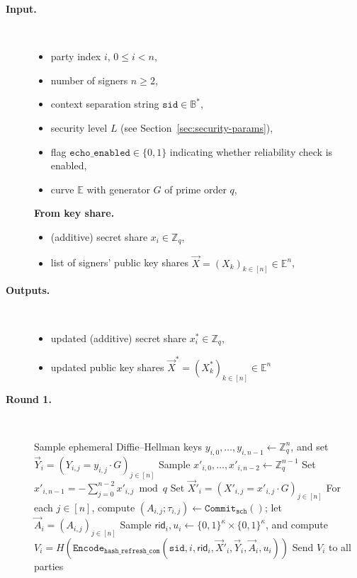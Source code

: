 \documentclass[11pt]{article}
\newcommand{\sid}{\ensuremath{\mathtt{sid}}}
\newcommand{\var}[1]{\ensuremath{\mathtt{#1}}}
\newcommand{\commit}[1]{\ensuremath{\mathtt{Commit}_{\mathtt{#1}}}}
\newcommand{\Encode}[1][]{\ensuremath{\mathtt{Encode}_{\mathtt{#1}}}}
\newcommand{\rid}{\textsf{rid}}
\newcommand{\E}{\mathbb{E}}
\newcommand{\Z}{\mathbb{Z}}
\newcommand{\?}[1]{\stackrel{?}{#1}}
\newcommand{\Bit}{\ensuremath{\{0{,}1\}}}
\newcommand{\Byte}{\ensuremath{\mathbb{B}}}
\begin{document}
\begin{description}
    \item[\bf Input.] \
    \begin{itemize}[noitemsep,topsep=0pt]
    \item party index $i$, $0 \le i < n$,
    \item number of signers $n \ge 2$,
    \item context separation string $\sid \in \Byte^*$,
    \item security level $L$ (see Section~\ref{sec:security-params}),
    \item flag $\var{echo\_enabled} \in \Bit$ indicating whether reliability check is enabled,
    \item curve $\E$ with generator $G$ of prime order $q$,
    \end{itemize}
    \textbf{From key share.}
    \begin{itemize}[noitemsep,topsep=0pt]
    \item (additive) secret share $x_i \in \Z_q$,
    \item list of signers' public key shares $\vec X = (X_k)_{k\in[n]} \in \E^n$,
    \end{itemize}

    \item[\bf Outputs.] \
    \begin{itemize}[noitemsep,topsep=0pt]
    \item updated (additive) secret share $x^*_i \in \Z_q$,
    \item updated public key shares $\vec X^* = (X^*_k)_{k\in[n]} \in \E^n$
    \end{itemize}

    \item[\textbf{Round 1.}] \
    \begin{algorithmic}[1]
        \State Sample ephemeral Diffie--Hellman keys $y_{i,0}, \dots, y_{i,n-1} \gets \Z_q^n$,
               and set $\vec Y_i = (Y_{i,j} = y_{i,j} \cdot G)_{j \in [n]}$
        \State Sample $x'_{i,0}, \ldots, x'_{i,n-2} \gets \Z_q^{n-1}$
        \State Set $x'_{i,n-1} = -\sum_{j=0}^{n-2} x'_{i,j} \bmod q$
        \State Set $\vec X'_i = (X'_{i,j} = x'_{i,j} \cdot G)_{j \in [n]}$
        \State For each $j \in [n]$, compute $(A_{i,j}; \tau_{i,j}) \gets \commit{sch}()$;
               let $\vec A_i = (A_{i,j})_{j \in [n]}$
        \State Sample $\rid_i, u_i \gets \Bit^\kappa \times \Bit^\kappa$,
               and compute $V_i = H(\Encode[hash\_refresh\_com](\sid, i, \rid_i, \vec X'_i, \vec Y_i, \vec A_i, u_i))$
        \State Send $V_i$ to all parties
    \end{algorithmic}


\end{description}
\end{document}
